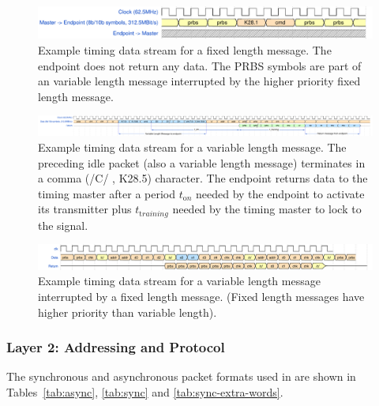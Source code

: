 \documentclass{dune}
\begin{document}
\begin{landscape}
\begin{figure}[h]
	\centering
	\includegraphics[width=\linewidth]{dts_sp-fixed-length-message.pdf}
	\caption{Example timing data stream for a fixed length message. The endpoint does not return any data. The PRBS symbols are part of an variable length message interrupted by the higher priority fixed length message.}
	\label{fig:wave-fixed-length}
\end{figure}

\begin{figure}[h]
	\centering
	\includegraphics[width=\linewidth]{dts_sp-variable-length-message_ed.pdf}
	\caption{Example timing data stream for a variable length message. The preceding idle packet (also a variable length message) terminates in a comma (/C/ , K28.5) character. The endpoint returns data to the timing master after a period $t_{\mathrm on}$ needed by the endpoint to activate its transmitter plus $t_{\mathrm training}$ needed by the timing master to lock to the signal.}
	\label{fig:wave-variable-length}
\end{figure}

\begin{figure}[h]
	\centering
	\includegraphics[width=\linewidth]{timing_protocol_wavedrom_01.pdf}
	\caption{Example timing data stream for a variable length message interrupted by a fixed length message. (Fixed length messages have higher priority than variable length).}
	\label{fig:wave-interupted-message}
\end{figure}
\end{landscape}


\subsubsection{Layer 2: Addressing and Protocol}

The synchronous and asynchronous packet formats used in  are shown in Tables~\ref{tab:async}, \ref{tab:sync} and \ref{tab:sync-extra-words}.
\end{document}
